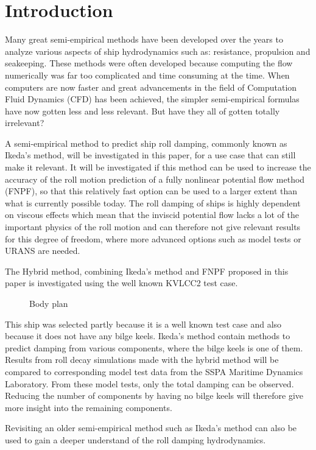 \section{Introduction}\label{introduction}

Many great semi-empirical methods have been developed over the years to
analyze various aspects of ship hydrodynamics such as: resistance,
propulsion and seakeeping. These methods were often developed because
computing the flow numerically was far too complicated and time consuming
at the time. When computers are now faster and great advancements in the
field of Computation Fluid Dynamics (CFD) has been achieved, the simpler
semi-empirical formulas have now gotten less and less relevant. But have
they all of gotten totally irrelevant?

A semi-empirical method to predict ship roll damping, commonly known as
Ikeda's method, will be investigated in this paper, for a use case that
can still make it relevant. It will be investigated if this method can
be used to increase the accuracy of the roll motion prediction of a
fully nonlinear potential flow method (FNPF), so that this relatively fast
option can be used to a larger extent than what is currently possible
today. The roll damping of ships is highly dependent on viscous effects
which mean that the inviscid potential flow lacks a lot of the important
physics of the roll motion and can therefore not give relevant results
for this degree of freedom, where more advanced options such as model
tests or URANS are needed.

The Hybrid method, combining Ikeda's method and FNPF proposed in this
paper is investigated using the well known KVLCC2 test case.
 
            
    
    \begin{figure}
        \begin{center}\end{center}
        \caption{Body plan}
        \label{fig:body_plan}
    \end{figure}
    

    This ship was selected partly because it is a well known test case and
also because it does not have any bilge keels. Ikeda's method contain
methods to predict damping from various components, where the bilge
keels is one of them. Results from roll decay simulations made with
the hybrid method will be compared to corresponding model test data from
the SSPA Maritime Dynamics Laboratory. From these model tests, only the
total damping can be observed. Reducing the number of components by
having no bilge keels will therefore give more insight into the
remaining components.

Revisiting an older semi-empirical method such as Ikeda's method can
also be used to gain a deeper understand of the roll damping
hydrodynamics.

    